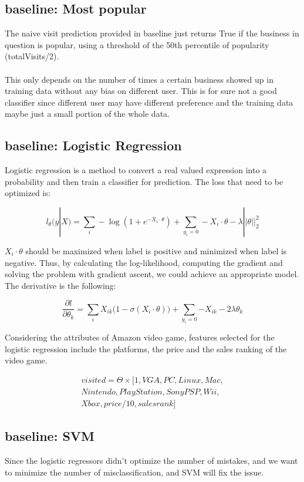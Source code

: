 \documentclass[paper=a4, fontsize=11pt, twocolumn]{scrartcl} %
\numberwithin{equation}{section} %
\numberwithin{figure}{section} %
\numberwithin{table}{section} %
\begin{document}
\subsection{baseline: Most popular}

The naive visit prediction provided in baseline just returns True if the business in question is popular, using a threshold of the 50th percentile of popularity (totalVisits/2).\\
\\
This only depends on the number of times a certain business showed up in training data without any bias on different user. This is for sure not a good classifier since different user may have different preference and the training data maybe just a small portion of the whole data.

\subsection{baseline: Logistic Regression}

Logistic regression is a method to convert a real valued expression into a probability and then train a classifier for prediction. The loss that need to be optimized is:

$$l_\theta (y|X)=\sum_i -\log (1+e^{-X_i \cdot \theta }) +
\sum_{y_i=0} - X_i \cdot \theta - \lambda ||\theta ||_2^2$$

$X_i \cdot \theta$ should be maximized when label is positive and minimized when label is negative. Thus, by calculating the log-likelihood, computing the gradient and solving the problem with gradient ascent, we could achieve an appropriate model. The derivative is the following:

$$\frac{\partial l}{\partial \theta _k}=
\sum_i{{X_{ik}}(1-\sigma ({X_i}\cdot \theta )})+
\sum_{{y_i}=0}{-{X_{ik}}}-2\lambda {\theta_k} $$

Considering the attributes of Amazon video game, features selected for the logistic regression include the platforms, the price and the sales ranking of the video game.

\begin{multline*}
visited = \Theta\times[1, VGA, PC, Linux, Mac, \\
Nintendo, PlayStation, Sony PSP, Wii,\\
Xbox, price/10,salesrank]
\end{multline*}


\subsection{baseline: SVM}
Since the logistic regressors didn’t optimize the number of mistakes, and we want to minimize the number of misclassification, and SVM will fix the issue.
\end{document}
